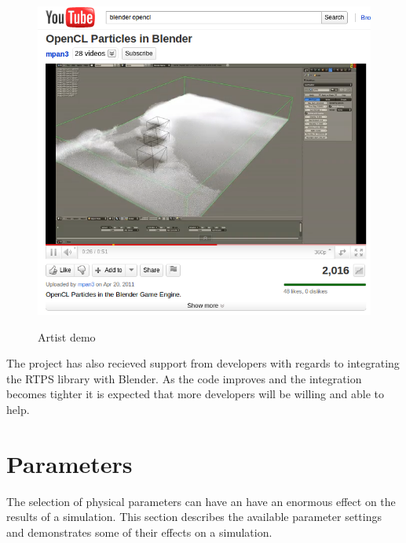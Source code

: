 \begin{figure}[!htc]
 		\centering
		\includegraphics[scale=0.5]{figures/youtube.png}
		\label{fig:logic}
        \caption{ Artist demo }
\end{figure}

The project has also recieved support from developers with regards to
integrating the RTPS library with Blender. As the code improves and the
integration becomes tighter it is expected that more developers will be willing
and able to help.

\section{Parameters}

The selection of physical parameters can have an have an enormous effect on the
results of a simulation. This section describes the available parameter
settings and demonstrates some of their effects on a simulation.



